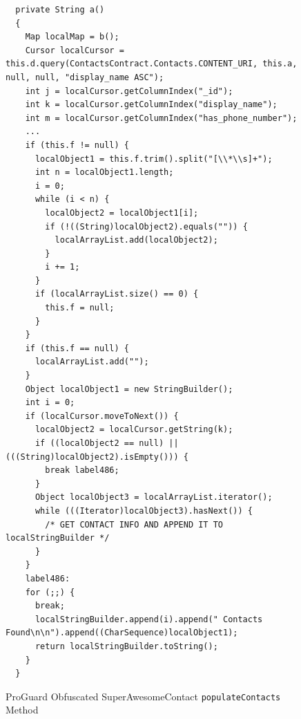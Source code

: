 \documentclass[conference,compsoc]{IEEEtran}
\begin{document}
\lstset{basicstyle=\small}
\begin{figure}
\begin{lstlisting}
  private String a()
  {
    Map localMap = b();
    Cursor localCursor = this.d.query(ContactsContract.Contacts.CONTENT_URI, this.a, null, null, "display_name ASC");
    int j = localCursor.getColumnIndex("_id");
    int k = localCursor.getColumnIndex("display_name");
    int m = localCursor.getColumnIndex("has_phone_number");
    ...
    if (this.f != null) {
      localObject1 = this.f.trim().split("[\\*\\s]+");
      int n = localObject1.length;
      i = 0;
      while (i < n) {
        localObject2 = localObject1[i];
        if (!((String)localObject2).equals("")) {
          localArrayList.add(localObject2);
        }
        i += 1;
      }
      if (localArrayList.size() == 0) {
        this.f = null;
      }
    }
    if (this.f == null) {
      localArrayList.add("");
    }
    Object localObject1 = new StringBuilder();
    int i = 0;
    if (localCursor.moveToNext()) {
      localObject2 = localCursor.getString(k);
      if ((localObject2 == null) || (((String)localObject2).isEmpty())) {
        break label486;
      }
      Object localObject3 = localArrayList.iterator();
      while (((Iterator)localObject3).hasNext()) {
      	/* GET CONTACT INFO AND APPEND IT TO localStringBuilder */
      }
    }
    label486:
    for (;;) {
      break;
      localStringBuilder.append(i).append(" Contacts Found\n\n").append((CharSequence)localObject1);
      return localStringBuilder.toString();
    }
  }
\end{lstlisting}
\caption{ProGuard Obfuscated SuperAwesomeContact \texttt{populateContacts} Method}
\label{fig:ObfPopCont}
\end{figure}



\clearpage
\newpage
{}

\end{document}
